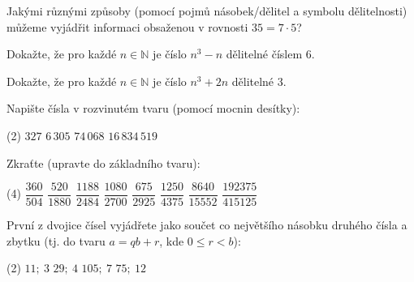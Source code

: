 \documentclass[12pt,a4paper]{article}
\begin{document}
\exercisepart
\setcounter{section}{1}

\begin{exercise}
Jakými různými způsoby (pomocí pojmů násobek/dělitel a symbolu dělitelnosti) můžeme vyjádřit informaci obsaženou v rovnosti $35 = 7 \cdot 5$?
\end{exercise}

\begin{exercise}

Dokažte, že pro každé $n \in \mathbb{N}$ je číslo $n^3 - n$ dělitelné číslem $6$.
\end{exercise}


\begin{exercise}

Dokažte, že pro každé $n \in \mathbb{N}$ je číslo $n^3 + 2n$ dělitelné $3$.
\end{exercise}


\begin{exercise}

Napište čísla v rozvinutém tvaru (pomocí mocnin desítky):
\begin{tasks}(2)
\task $327$
\task $6\,305$
\task $74\,068$
\task $16\,834\,519$
\end{tasks}
\end{exercise}


\begin{exercise}

Zkraťte (upravte do základního tvaru):
\begin{tasks}(4)
\task $\dfrac{360}{504}$
\task $\dfrac{520}{1880}$
\task $\dfrac{1188}{2484}$
\task $\dfrac{1080}{2700}$
\task $\dfrac{675}{2925}$
\task $\dfrac{1250}{4375}$
\task $\dfrac{8640}{15552}$
\task $\dfrac{192375}{415125}$
\end{tasks}
\end{exercise}


\begin{exercise}

První z dvojice čísel vyjádřete jako součet co největšího násobku druhého čísla a zbytku (tj. do tvaru $a = qb + r$, kde $0 \le r < b$):
\begin{tasks}(2)
\task $11;\ 3$
\task $29;\ 4$
\task $105;\ 7$
\task $75;\ 12$
\end{tasks}
\end{exercise}
\end{document}
